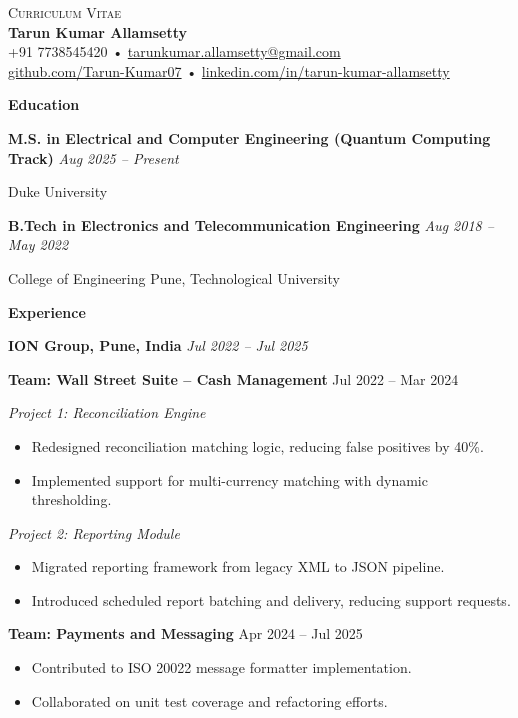 \documentclass[a4paper,10pt]{article}
\newcommand{\cvSection}[1]{%
  \vspace{1.2em}
  \noindent\textbf{\large #1} \\
  \vspace{0.2em}
}
\newcommand{\cvSubheading}[2]{%
  \vspace{0.5em}
  \noindent\textbf{#1} \hfill \textit{#2} \\
  \vspace{0.2em}
}
\newcommand{\cvItem}[1]{%
  \noindent\parbox{\dimexpr\linewidth}{#1}\par\vspace{0.4em}
}
\newenvironment{cvItemList}{
  \begin{itemize}
    \setlength{\itemsep}{0.2em}
    \setlength{\topsep}{0em}
    \setlength{\partopsep}{0em}
    \setlength{\parsep}{0em}
    \setlength{\parskip}{0em}
}{
  \end{itemize}
}
\begin{document}
\begin{center}
  {\large \textsc{Curriculum Vitae}} \\[0.3em]
  {\LARGE \textbf{Tarun Kumar Allamsetty}} \\[0.75em]
  \small
  +91 7738545420 \quad • \quad \href{mailto:tarunkumar.allamsetty@gmail.com}{tarunkumar.allamsetty@gmail.com} \\[0.2em]
  \href{https://github.com/Tarun-Kumar07}{github.com/Tarun-Kumar07} \quad • \quad
  \href{https://www.linkedin.com/in/tarun-kumar-allamsetty}{linkedin.com/in/tarun-kumar-allamsetty}
\end{center}

\vspace{2em}

\cvSection{Education}

\cvSubheading{M.S. in Electrical and Computer Engineering (Quantum Computing Track)}{Aug 2025 -- Present}
\cvItem{Duke University}

\cvSubheading{B.Tech in Electronics and Telecommunication Engineering}{Aug 2018 -- May 2022}
\cvItem{College of Engineering Pune, Technological University}

\cvSection{Experience}

\cvSubheading{ION Group, Pune, India}{Jul 2022 -- Jul 2025}

\cvItem{\textbf{Team: Wall Street Suite – Cash Management} \hfill Jul 2022 -- Mar 2024}

\cvItem{\textit{Project 1: Reconciliation Engine}}
\begin{cvItemList}
  \item Redesigned reconciliation matching logic, reducing false positives by 40\%.
  \item Implemented support for multi-currency matching with dynamic thresholding.
\end{cvItemList}

\cvItem{\textit{Project 2: Reporting Module}}
\begin{cvItemList}
  \item Migrated reporting framework from legacy XML to JSON pipeline.
  \item Introduced scheduled report batching and delivery, reducing support requests.
\end{cvItemList}

\cvItem{\textbf{Team: Payments and Messaging} \hfill Apr 2024 -- Jul 2025}
\begin{cvItemList}
  \item Contributed to ISO 20022 message formatter implementation.
  \item Collaborated on unit test coverage and refactoring efforts.
\end{cvItemList}
\end{document}
